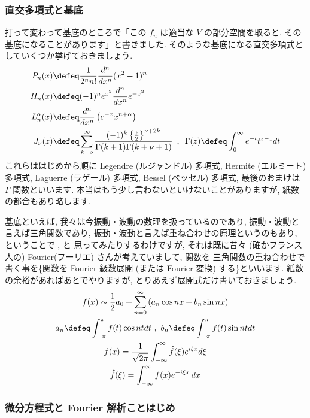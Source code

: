\documentclass[openany, a4paper, oneside]{jsbook}
\begin{document}
\subsubsection{直交多項式と基底}

打って変わって基底のところで「この $f_n$ は適当な $V$ の部分空間を取ると, その基底になることがあります」と書きました.
そのような基底になる直交多項式としていくつか挙げておきましょう.
\begin{align}
P_n (x) &\defeq \frac{1}{2^n n!}\frac{d^n}{dx^n}(x^2-1)^n \\
H_n (x) &\defeq (-1)^n e^{x^2} \frac{d^n}{dx^n}e^{-x^2} \\
L_n^{\alpha}(x) &\defeq \frac{d^n}{dx^n}\left ( e^{-x} x^{n + \alpha} \right) \\
J_{\nu }(z) &\defeq \sum_{k=o}^{\infty} \frac{(-1)^k \left \{ \frac{z}{2} \right \}^{\nu + 2k}}
{\Gamma (k + 1) \Gamma (k + \nu +1)}
\,\,\, , \,\,\, \Gamma (z) \defeq \int_0^{\infty}e^{-t}t^{z-1}dt
\end{align}
これらははじめから順に Legendre (ルジャンドル) 多項式, Hermite (エルミート) 多項式,
Laguerre (ラゲール) 多項式, Bessel (ベッセル) 多項式, 最後のおまけは $\Gamma$ 関数といいます.
本当はもう少し言わないといけないことがありますが, 紙数の都合もあり略します.

基底といえば, 我々は今振動・波動の数理を扱っているのであり, 振動・波動と言えば三角関数であり,
振動・波動と言えば重ね合わせの原理というのもあり, ということで
, と
思ってみたりするわけですが, それは既に昔々 (確かフランス人の) Fourier(フーリエ) さんが考えていまして, 関数を
三角関数の重ね合わせで書く事を\textgt\{関数を Fourier 級数展開
(または Fourier 変換) する\}といいます.
紙数の余裕があればあとでやりますが, とりあえず展開式だけ書いておきましょう.
\begin{gather}
f (x)
\sim
\frac{1}{2}a_0 + \sum_{n=0}^{\infty} \left ( a_n \cos nx + b_n \sin nx  \right) \\
a_n \defeq \int_{-\pi}^{\pi}f (t)\cos n t dt \,\, , \,\,
b_n \defeq \int_{-\pi}^{\pi}f (t)\sin n t dt \\
f (x)
=
\frac{1}{ \sqrt{ 2 \pi } } \int_{-\infty}^{\infty}  \hat{f}( \xi ) e^{i\xi x}d\xi \\
\hat{f}(\xi)
=
\int_{-\infty}^{\infty} f (x) e^{-i \xi x} \, dx
\end{gather}
\subsubsection{微分方程式と Fourier 解析ことはじめ}
\end{document}
